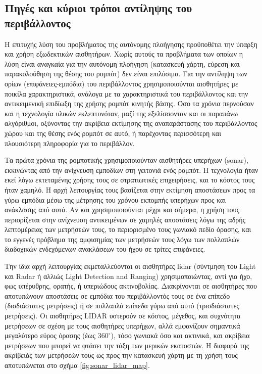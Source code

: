 \subsection{Πηγές και κύριοι τρόποι αντίληψης του περιβάλλοντος}

Η επιτυχής λύση του προβλήματος της αυτόνομης πλοήγησης προϋποθέτει την ύπαρξη
και χρήση εξωδεκτικών αισθητήρων. Χωρίς αυτούς τα προβλήματα των οποίων η λύση
είναι αναγκαία για την αυτόνομη πλοήγηση (κατασκευή χάρτη, εύρεση και
παρακολούθηση της θέσης του ρομπότ) δεν είναι επιλύσιμα. Για την αντίληψη των
ορίων (επιφάνειες-εμπόδια) του περιβάλλοντος χρησιμοποιούνται αισθητήρες με
ποικίλα χαρακτηριστικά, ανάλογα με τα χαρακτηριστικά του περιβάλλοντος και
την αντικειμενική επιδίωξη της χρήσης ρομπότ κινητής βάσης. Όσο τα χρόνια
περνούσαν και η τεχνολογία υλικών εκλεπτυνόταν, μαζί της εξελίσσονταν και
οι παραπάνω αλγόριθμοι, οξύνοντας την ακρίβεια εκτίμησης της αναπαράστασης
του περιβάλλοντος χώρου και της θέσης ενός ρομπότ σε αυτό, ή παρέχοντας
περισσότερη και πλουσιότερη πληροφορία για το περιβάλλον.

Τα πρώτα χρόνια της ρομποτικής χρησιμοποιούνταν αισθητήρες υπερήχων (sonar),
εκκινώντας από την ανίχνευση εμποδίων στη γειτονιά ενός ρομπότ. Η τεχνολογία
ήταν εκεί λόγω εκτεταμένης χρήσης τους σε στρατιωτικές επιχειρήσεις, και το
κόστος τους ήταν χαμηλό. Η αρχή λειτουργίας τους βασίζεται στην εκτίμηση
αποστάσεων προς τα γύρω εμπόδια μέσω της μέτρησης του χρόνου εκπομπής υπερήχων
προς και ανάκλασης από αυτά. Αν και χρησιμοποιούνται μέχρι και σήμερα, η χρήση
τους περιορίζεται στην ανίχνευση αντικειμένων σε χαμηλές αποστάσεις λόγω της
αδρής λεπτομέρειας των μετρήσεών τους, το περιορισμένο τους γωνιακό πεδίο
όρασης, και το εγγενές πρόβλημα της αμφισημίας των μετρήσεών τους λόγω των
πολλαπλών διαδοχικών ενδεχόμενων ανακλάσεων του ήχου σε τρίτες επιφάνειες.

Την ίδια αρχή λειτουργίας εκμεταλλεύονται οι αισθητήρες lidar (σύντμηση του
Light και Radar ή αλλιώς Light Detection and Ranging) χρησιμοποιώντας, αντί για
ήχο, φως υπέρυθρης, ορατής, ή υπεριώδους ακτινοβολίας. Διακρίνονται σε
αισθητήρες που αποτυπώνουν αποστάσεις σε εμπόδια του περιβάλλοντός τους σε ένα
επίπεδο (δισδιάστατες μετρήσεις) ή σε πολλαπλά επίπεδα γύρω από αυτό
(τρισδιάστατες μετρήσεις). Οι αισθητήρες LIDAR υστερούν σε κόστος, μέγεθος, και
συχνότητα μετρήσεων σε σχέση με τους αισθητήρες υπερήχων, αλλά εμφανίζουν
σημαντικά μεγαλύτερο εύρος όρασης (έως $360^\circ$), τόσο γωνιακά όσο και
ακτινικά, και ακρίβεια μετρήσεων που μπορεί να φτάσει την τάξη των μερικών
εκατοστών.  Η διαφορά της ακρίβειάς των μετρήσεών τους ως προς την κατασκευή
χάρτη με τη χρήση τους αποτυπώνεται στο σχήμα \ref{fig:sonar_lidar_map}.

